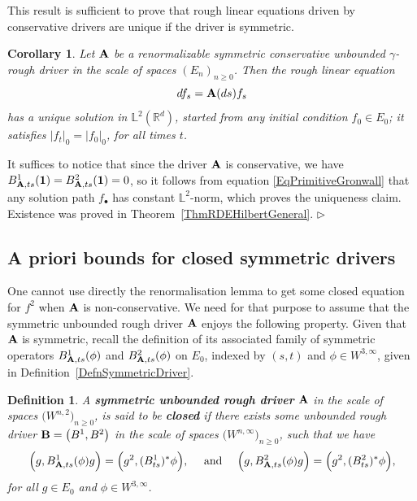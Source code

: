 \documentclass[11pt,a4paper]{amsart}
\newcommand{\RR}{\mathbb{R}}  \newcommand{\CC}{\mathbb{C}}  \newcommand{\LL}{\mathbb{L}}  \newcommand{\WW}{\mathbb{W}}
\renewcommand{\geq}{\geqslant}
\newcommand{\ssk}{\smallskip}
\newtheorem{cor}[thm]{\hspace{-0.15cm}  {\sc Corollary} }%
\newtheorem{defn}[thm]{ \hspace{-0.3cm} {\sc Definition}}%
\numberwithin{equation}{section} %
\newenvironment{Dem}{%
    \begin{list}{\hspace{0.5cm}{\sc Proof --}}{%
        \setlength{\topsep}{0pt}%
        \setlength{\leftmargin}{0pt}%
        \setlength{\rightmargin}{0pt}%
        \setlength{\listparindent}{0pt}%
        \setlength{\itemindent}{0pt}%
        \setlength{\parsep}{0pt}%
        \addtolength{\leftmargin}{20pt}%
        \addtolength{\rightmargin}{0pt}%
    } \item }{\hfill{\space $\rhd$}\end{list}\smallskip}
\begin{document}
\bigskip

This result is sufficient to prove that rough linear equations driven by conservative drivers are unique if the driver is symmetric. 

\begin{cor}
\label{CorClosedSymmCons}
Let $\bf A$ be a renormalizable symmetric conservative unbounded $\gamma$-rough driver in the scale of spaces $(E_n)_{n\geq 0}$. Then the rough linear equation
$$
df_s = {\bf A}(ds)f_s
$$
has a unique solution in $\LL^2(\RR^d)$, started from any initial condition $f_0\in E_0$; it satisfies $\big|f_t\big|_0 = \big|f_0\big|_0$, for all times $t$.
\end{cor}

\ssk

\begin{Dem}
It suffices to notice that since the driver $\bf A$ is conservative, we have $B^1_{{\bf A},ts}({\bf 1}) = B^2_{{\bf A},ts}({\bf 1}) = 0$, so it follows from equation \eqref{EqPrimitiveGronwall} that any solution path $f_\bullet$ has constant $\LL^2$-norm, which proves the uniqueness claim. Existence was proved in Theorem~\ref{ThmRDEHilbertGeneral}.
\end{Dem}


\bigskip


\subsection{A priori bounds for closed symmetric drivers}
\label{SymmetricDrivers}

One cannot use directly the renormalisation lemma to get some closed equation for $f^2$ when $\bf A$ is non-conservative. We need for that purpose to assume that the symmetric unbounded rough driver $\bf A$ enjoys the following property. Given that $\bf A$ is symmetric, recall the definition of its associated family of symmetric operators $B^1_{{\bf A},ts}(\phi)$ and $B^2_{{\bf A},ts}(\phi)$ on $E_0$, indexed by $(s,t)$ and $\phi\in W^{3,\infty}$, given in Definition~\ref{DefnSymmetricDriver}.

\begin{defn}
\label{DefnClosedDriver}
A \emph{\textbf{symmetric unbounded rough driver}} $\bf A$ in the scale of spaces $\big(W^{n,2}\big)_{n\geq 0}$, is said to be \emph{\textbf{closed}} if there exists some unbounded rough driver ${\bf B}=\big(B^1,B^2\big)$ in the scale of spaces $\big(W^{n,\infty}\big)_{n\geq 0}$, such that we have  
$$
\Big(g,B^1_{{\bf A},ts}(\phi)g\Big) = \Big(g^2,(B^1_{ts})^*\phi\Big), \quad \textrm{  and  } \quad \Big(g,B^2_{{\bf A},ts}(\phi)g\Big) = \Big(g^2,(B^2_{ts})^*\phi\Big),
$$
for all $g\in E_0$ and $\phi\in W^{3,\infty}$. 
\end{defn}
\end{document}
